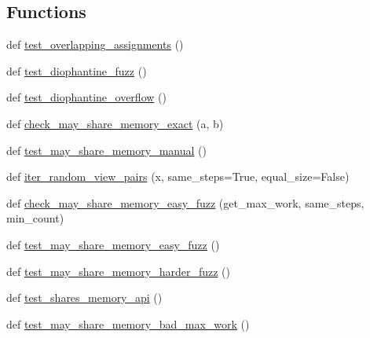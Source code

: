 \subsection*{Functions}
\begin{DoxyCompactItemize}
\item 
def \hyperlink{namespacenumpy_1_1core_1_1tests_1_1test__mem__overlap_a942eef6ab374b5a18a5475924e69ff37}{test\+\_\+overlapping\+\_\+assignments} ()
\item 
def \hyperlink{namespacenumpy_1_1core_1_1tests_1_1test__mem__overlap_a92b67c7dbf52be06b075e6a6d78ceed9}{test\+\_\+diophantine\+\_\+fuzz} ()
\item 
def \hyperlink{namespacenumpy_1_1core_1_1tests_1_1test__mem__overlap_a8be030c55f642c9de4f1a68a4bc22e1c}{test\+\_\+diophantine\+\_\+overflow} ()
\item 
def \hyperlink{namespacenumpy_1_1core_1_1tests_1_1test__mem__overlap_ac95695f5b4a11178d90f0453ab1a782c}{check\+\_\+may\+\_\+share\+\_\+memory\+\_\+exact} (a, b)
\item 
def \hyperlink{namespacenumpy_1_1core_1_1tests_1_1test__mem__overlap_a00af59f5bd453b81cb96622d02a8237f}{test\+\_\+may\+\_\+share\+\_\+memory\+\_\+manual} ()
\item 
def \hyperlink{namespacenumpy_1_1core_1_1tests_1_1test__mem__overlap_a7fb8173e88c91e7f6414da03716e9903}{iter\+\_\+random\+\_\+view\+\_\+pairs} (x, same\+\_\+steps=True, equal\+\_\+size=False)
\item 
def \hyperlink{namespacenumpy_1_1core_1_1tests_1_1test__mem__overlap_a8d4636a61a3bf7cfa71c8348c19ac20c}{check\+\_\+may\+\_\+share\+\_\+memory\+\_\+easy\+\_\+fuzz} (get\+\_\+max\+\_\+work, same\+\_\+steps, min\+\_\+count)
\item 
def \hyperlink{namespacenumpy_1_1core_1_1tests_1_1test__mem__overlap_aa2399a47d174ec5d73861847e0b40088}{test\+\_\+may\+\_\+share\+\_\+memory\+\_\+easy\+\_\+fuzz} ()
\item 
def \hyperlink{namespacenumpy_1_1core_1_1tests_1_1test__mem__overlap_a3ca24a8f3b5aec64667ea455abd39a63}{test\+\_\+may\+\_\+share\+\_\+memory\+\_\+harder\+\_\+fuzz} ()
\item 
def \hyperlink{namespacenumpy_1_1core_1_1tests_1_1test__mem__overlap_a7551cc728d7b0f4dfd14559493d7f723}{test\+\_\+shares\+\_\+memory\+\_\+api} ()
\item 
def \hyperlink{namespacenumpy_1_1core_1_1tests_1_1test__mem__overlap_a13ba72aaee20657290a11be33344313f}{test\+\_\+may\+\_\+share\+\_\+memory\+\_\+bad\+\_\+max\+\_\+work} ()
\item 

\end{DoxyCompactItemize}
